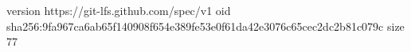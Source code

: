 version https://git-lfs.github.com/spec/v1
oid sha256:9fa967ca6ab65f140908f654e389fe53e0f61da42e3076c65cec2dc2b81c079c
size 77
